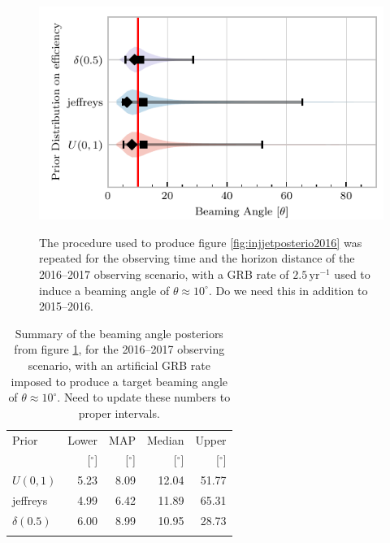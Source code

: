 \documentclass[twocolumn,nofootinbib]{revtex4-1}
\newcommand{\yr}{\mathrm{yr}}
\newcommand{\dwnote}[1]{{\color{dwnote}{[\textbf{DW}: #1]}}}
\renewcommand{\dwnote}{}
\begin{document}
\begin{figure}%
\centering
{\includegraphics[width=\linewidth]{O2_injections_violin.pdf}}
\caption{The procedure used to produce figure \ref{fig:injjetposterio2016} was repeated for the observing time and the horizon distance of the 2016--2017 observing scenario, with a GRB rate of $2.5 \,\yr^{-1}$ used to induce a beaming angle of $\theta \approx 10^{\circ}$.
  \dwnote{Do we need this in addition to 2015--2016.}
  \label{fig:injjetposterio2022}}
\end{figure}
\begin{table}
  \centering
  \begin{tabular}{lrrrr}
    \toprule
    Prior & Lower & MAP & Median & Upper\\
          & [$^\circ$] & [$^\circ$]& [$^\circ$]& [$^\circ$] \\
    \colrule
$U(0,1)$ & 5.23	 & 8.09	 & 12.04	 & 51.77	 \\
jeffreys & 4.99	 & 6.42	 & 11.89	 & 65.31	 \\
$\delta(0.5)$ & 6.00	 & 8.99	 & 10.95	 & 28.73	 \\
\botrule
\end{tabular}
\caption{Summary of the beaming angle posteriors from figure
  \ref{fig:injjetposterio2022}, for the 2016--2017 observing scenario,
  with an artificial GRB rate imposed to produce a target beaming
  angle of $\theta \approx 10^{\circ}$.   \dwnote{Need to update these numbers to proper intervals.}}
  \label{tab:summaryinj2016}
\end{table}
\end{document}
